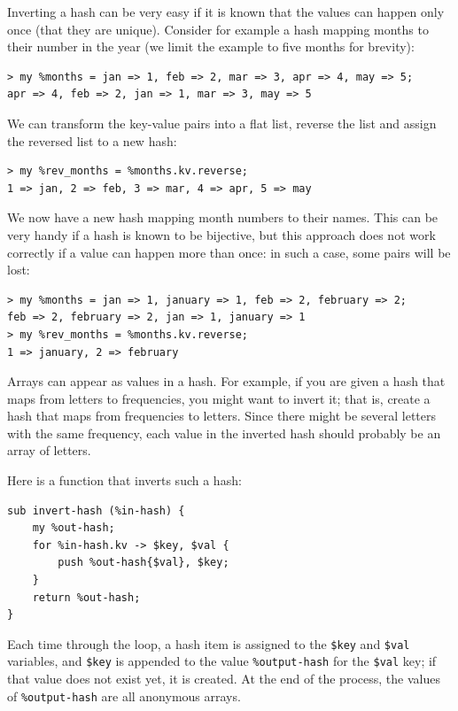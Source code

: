 Inverting a hash can be very easy if it is known that the 
values can happen only once (that they are unique). Consider 
for example a hash mapping months to their number in the year 
(we limit the example to five months for brevity):

\begin{verbatim}
> my %months = jan => 1, feb => 2, mar => 3, apr => 4, may => 5;
apr => 4, feb => 2, jan => 1, mar => 3, may => 5
\end{verbatim}
%

We can transform the key-value pairs into a flat list, 
reverse the list and assign the reversed list to a new 
hash:

\begin{verbatim}
> my %rev_months = %months.kv.reverse;
1 => jan, 2 => feb, 3 => mar, 4 => apr, 5 => may
\end{verbatim}
%

We now have a new hash mapping month numbers to their names.
This can be very handy if a hash is known to be bijective, but this approach does not work correctly if a value can 
happen more than once: in such a case, some pairs will be 
lost:

\begin{verbatim}
> my %months = jan => 1, january => 1, feb => 2, february => 2;
feb => 2, february => 2, jan => 1, january => 1
> my %rev_months = %months.kv.reverse;
1 => january, 2 => february
\end{verbatim}

Arrays can appear as values in a hash.  For example, if you
are given a hash that maps from letters to frequencies, you
might want to invert it; that is, create a hash that maps
from frequencies to letters.  Since there might be several 
letters with the same frequency, each value in the inverted hash 
should probably be an array of letters.

Here is a function that inverts such a hash:

\begin{verbatim}
sub invert-hash (%in-hash) { 
    my %out-hash; 
    for %in-hash.kv -> $key, $val {
        push %out-hash{$val}, $key; 
    }
    return %out-hash;
}
\end{verbatim}
%
Each time through the loop, a hash item is assigned to the  \verb'$key' and \verb'$val' variables, and \verb'$key' is 
appended to the value \verb'%output-hash' for the \verb'$val' 
key; if that value does not exist yet, it is created. At 
the end of the process, the values of \verb'%output-hash' are 
all anonymous arrays.

